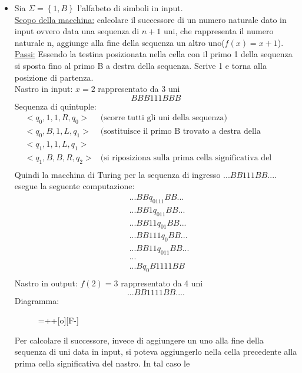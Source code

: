\begin{itemize}
\item Sia $\Sigma=\left\{1,B\right\}$ l'alfabeto di simboli in
  input. \\\underline{Scopo della macchina:} calcolare il successore
  di un numero naturale dato in input ovvero data una sequenza di
  $n+1$ uni, che rappresenta il numero naturale n, aggiunge alla fine
  della sequenza un altro uno($f(x)=x+1$).\\\underline{Passi:} Essendo
  la testina posizionata nella cella con il primo 1 della sequenza si
  sposta fino al primo B a destra della sequenza. Scrive 1 e torna
  alla posizione di partenza.\\ Nastro in input: $x=2$ rappresentato
  da 3 uni $$BBB111BBB$$ Sequenza di quintuple:
\begin{eqnarray*}
&<q_0,1,1,R,q_0>&\mbox{(scorre tutti gli uni della sequenza)}\\
&<q_0,B,1,L,q_1>&\mbox{(sostituisce il primo B trovato a destra della sequenza con un 1)}\\
&<q_1,1,1,L,q_1>&\\
&<q_1,B,B,R,q_{2}>&\mbox{(si riposiziona sulla prima cella significativa del nastro)}\\
\end{eqnarray*}
Quindi la macchina di Turing per la sequenza di ingresso
$...BB111BB....$ esegue la seguente computazione:
\begin{eqnarray*}
&...BBq_0111BB...\\
&...BB1q_011BB...\\
&...BB11q_01BB...\\
&...BB111q_0BB...\\
&...BB11q_011BB...\\
&...\\
&...Bq_0B1111BB\\
\end{eqnarray*}
Nastro in output: $f(2)=3$ rappresentato da 4 uni $$...BB1111BB....$$
Diagramma:
\begin{figure}[hbtp!]
\hspace{3 cm} \entrymodifiers={++[o][F-]} \\
\end{figure}
\begin{osservazione}
Per calcolare il successore, invece di aggiungere un uno alla fine
della sequenza di uni data in input, si poteva aggiungerlo nella cella
precedente alla prima cella significativa del nastro. In tal caso le

\end{osservazione}
\end{itemize}

